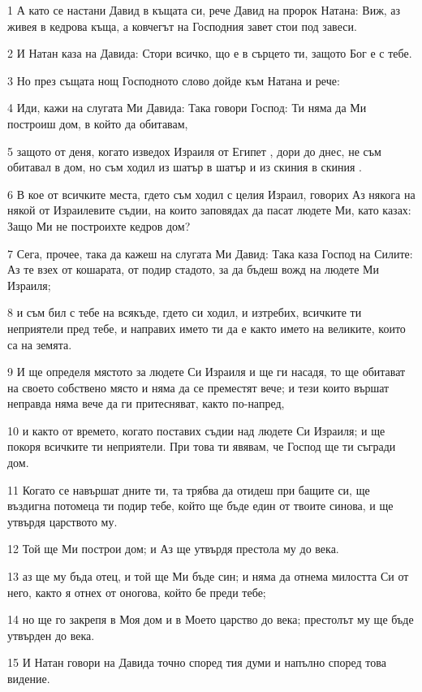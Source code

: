\par 1 А като се настани Давид в къщата си, рече Давид на пророк Натана: Виж, аз живея в кедрова къща, а ковчегът на Господния завет стои под завеси.
\par 2 И Натан каза на Давида: Стори всичко, що е в сърцето ти, защото Бог е с тебе.
\par 3 Но през същата нощ Господното слово дойде към Натана и рече:
\par 4 Иди, кажи на слугата Ми Давида: Така говори Господ: Ти няма да Ми построиш дом, в който да обитавам,
\par 5 защото от деня, когато изведох Израиля от Египет , дори до днес, не съм обитавал в дом, но съм ходил из шатър в шатър и из скиния в скиния .
\par 6 В кое от всичките места, гдето съм ходил с целия Израил, говорих Аз някога на някой от Израилевите съдии, на които заповядах да пасат людете Ми, като казах: Защо Ми не построихте кедров дом?
\par 7 Сега, прочее, така да кажеш на слугата Ми Давид: Така каза Господ на Силите: Аз те взех от кошарата, от подир стадото, за да бъдеш вожд на людете Ми Израиля;
\par 8 и съм бил с тебе на всякъде, гдето си ходил, и изтребих, всичките ти неприятели пред тебе, и направих името ти да е както името на великите, които са на земята.
\par 9 И ще определя мястото за людете Си Израиля и ще ги насадя, то ще обитават на своето собствено място и няма да се преместят вече; и тези които вършат неправда няма вече да ги притесняват, както по-напред,
\par 10 и както от времето, когато поставих съдии над людете Си Израиля; и ще покоря всичките ти неприятели. При това ти явявам, че Господ ще ти съгради дом.
\par 11 Когато се навършат дните ти, та трябва да отидеш при бащите си, ще въздигна потомеца ти подир тебе, който ще бъде един от твоите синова, и ще утвърдя царството му.
\par 12 Той ще Ми построи дом; и Аз ще утвърдя престола му до века.
\par 13 аз ще му бъда отец, и той ще Ми бъде син; и няма да отнема милостта Си от него, както я отнех от оногова, който бе преди тебе;
\par 14 но ще го закрепя в Моя дом и в Моето царство до века; престолът му ще бъде утвърден до века.
\par 15 И Натан говори на Давида точно според тия думи и напълно според това видение.
